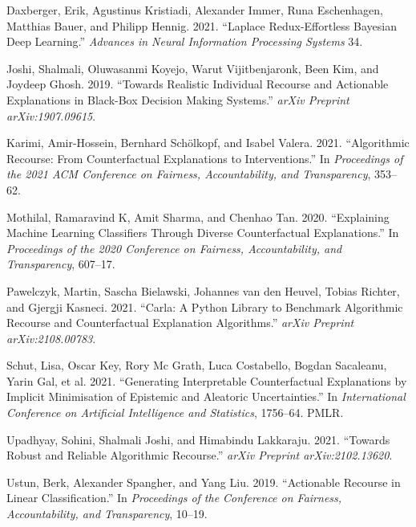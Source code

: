 \documentclass[
  sigconf]{acmart}
\newlength{\cslhangindent}
\newlength{\cslentryspacingunit} %
\newenvironment{CSLReferences}[2] %
 {%
  \setlength{\parindent}{0pt}
  \ifodd #1
  \let\oldpar\par
  \def\par{\hangindent=\cslhangindent\oldpar}
  \fi
  \setlength{\parskip}{#2\cslentryspacingunit}
 }%
 {}
\begin{document}
\hypertarget{refs}{}
\begin{CSLReferences}{1}{0}
\leavevmode{}%
Daxberger, Erik, Agustinus Kristiadi, Alexander Immer, Runa Eschenhagen,
Matthias Bauer, and Philipp Hennig. 2021. {``Laplace Redux-Effortless
Bayesian Deep Learning.''} \emph{Advances in Neural Information
Processing Systems} 34.

\leavevmode{}%
Joshi, Shalmali, Oluwasanmi Koyejo, Warut Vijitbenjaronk, Been Kim, and
Joydeep Ghosh. 2019. {``Towards Realistic Individual Recourse and
Actionable Explanations in Black-Box Decision Making Systems.''}
\emph{arXiv Preprint arXiv:1907.09615}.

\leavevmode{}%
Karimi, Amir-Hossein, Bernhard Schölkopf, and Isabel Valera. 2021.
{``Algorithmic Recourse: From Counterfactual Explanations to
Interventions.''} In \emph{Proceedings of the 2021 ACM Conference on
Fairness, Accountability, and Transparency}, 353--62.

\leavevmode{}%
Mothilal, Ramaravind K, Amit Sharma, and Chenhao Tan. 2020.
{``Explaining Machine Learning Classifiers Through Diverse
Counterfactual Explanations.''} In \emph{Proceedings of the 2020
Conference on Fairness, Accountability, and Transparency}, 607--17.

\leavevmode{}%
Pawelczyk, Martin, Sascha Bielawski, Johannes van den Heuvel, Tobias
Richter, and Gjergji Kasneci. 2021. {``Carla: A Python Library to
Benchmark Algorithmic Recourse and Counterfactual Explanation
Algorithms.''} \emph{arXiv Preprint arXiv:2108.00783}.

\leavevmode{}%
Schut, Lisa, Oscar Key, Rory Mc Grath, Luca Costabello, Bogdan
Sacaleanu, Yarin Gal, et al. 2021. {``Generating Interpretable
Counterfactual Explanations by Implicit Minimisation of Epistemic and
Aleatoric Uncertainties.''} In \emph{International Conference on
Artificial Intelligence and Statistics}, 1756--64. PMLR.

\leavevmode{}%
Upadhyay, Sohini, Shalmali Joshi, and Himabindu Lakkaraju. 2021.
{``Towards Robust and Reliable Algorithmic Recourse.''} \emph{arXiv
Preprint arXiv:2102.13620}.

\leavevmode{}%
Ustun, Berk, Alexander Spangher, and Yang Liu. 2019. {``Actionable
Recourse in Linear Classification.''} In \emph{Proceedings of the
Conference on Fairness, Accountability, and Transparency}, 10--19.


\end{CSLReferences}
\end{document}
